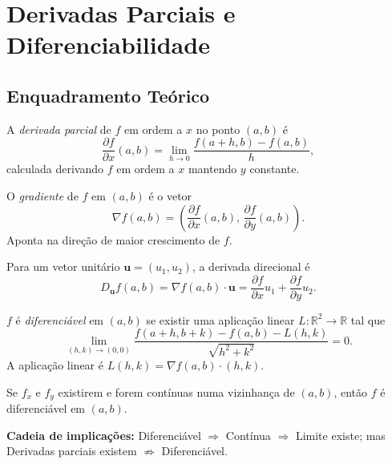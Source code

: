 \section{Derivadas Parciais e Diferenciabilidade}

\subsection{Enquadramento Teórico}

\begin{defbox}[title={Derivada Parcial}]
  A \emph{derivada parcial} de $f$ em ordem a $x$ no ponto $(a,b)$ é
  \[
    \frac{\partial f}{\partial x}(a,b)
    = \lim_{h\to 0}\frac{f(a+h,b)-f(a,b)}{h},
  \]
  calculada derivando $f$ em ordem a $x$ mantendo $y$ constante.
\end{defbox}

\begin{defbox}[title={Gradiente}]
  O \emph{gradiente} de $f$ em $(a,b)$ é o vetor
  \[
    \nabla f(a,b) = \left(\frac{\partial f}{\partial x}(a,b),\,
                          \frac{\partial f}{\partial y}(a,b)\right).
  \]
  Aponta na direção de maior crescimento de $f$.
\end{defbox}

\begin{defbox}[title={Derivada Direcional}]
  Para um vetor unitário $\mathbf{u}=(u_1,u_2)$, a derivada direcional é
  \[
    D_{\mathbf{u}}f(a,b) = \nabla f(a,b)\cdot\mathbf{u}
      = \frac{\partial f}{\partial x}u_1 + \frac{\partial f}{\partial y}u_2.
  \]
\end{defbox}

\begin{defbox}[title={Diferenciabilidade}]
  $f$ é \emph{diferenciável} em $(a,b)$ se existir uma aplicação linear
  $L:\mathbb{R}^2\to\mathbb{R}$ tal que
  \[
    \lim_{(h,k)\to(0,0)}\frac{f(a+h,b+k)-f(a,b)-L(h,k)}{\sqrt{h^2+k^2}}=0.
  \]
  A aplicação linear é $L(h,k)=\nabla f(a,b)\cdot(h,k)$.
\end{defbox}

\begin{thmbox}[title={Condição Suficiente de Diferenciabilidade e Cadeia de Implicações}]
  Se $f_x$ e $f_y$ existirem e forem contínuas numa vizinhança de $(a,b)$,
  então $f$ é diferenciável em $(a,b)$.

  \medskip
  \textbf{Cadeia de implicações:}
  Diferenciável $\Rightarrow$ Contínua $\Rightarrow$ Limite existe;
  mas Derivadas parciais existem $\not\Rightarrow$ Diferenciável.
\end{thmbox}

